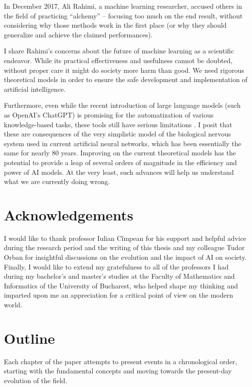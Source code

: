 In December 2017, Ali Rahimi, a machine learning researcher, accused others in the field of practicing ``alchemy'' \cite{Hutson2018_MachineLearningIsAlchemy} -- focusing too much on the end result, without considering why those methods work in the first place (or why they should generalize and achieve the claimed performances).

I share Rahimi's concerns about the future of machine learning as a scientific endeavor. While its practical effectiveness and usefulness cannot be doubted, without proper care it might do society more harm than good. We need rigorous theoretical models in order to ensure the safe development and implementation of artificial intelligence.

Furthermore, even while the recent introduction of large language models (such as OpenAI's ChatGPT) is promising for the automatization of various knowledge-based tasks, these tools still have serious limitations \cite{Bender2021}. I posit that these are consequences of the very simplistic model of the biological nervous system used in current artificial neural networks, which has been essentially the same for nearly 80 years. Improving on the current theoretical models has the potential to provide a leap of several orders of magnitude in the efficiency and power of AI models. At the very least, such advances will help us understand what we are currently doing wrong.

\section{Acknowledgements}

I would like to thank professor Iulian Cîmpean for his support and helpful advice during the research period and the writing of this thesis and my colleague Tudor Orban for insightful discussions on the evolution and the impact of AI on society. Finally, I would like to extend my gratefulness to all of the professors I had during my bachelor's and master's studies at the Faculty of Mathematics and Informatics of the University of Bucharest, who helped shape my thinking and imparted upon me an appreciation for a critical point of view on the modern world.

\section{Outline}

Each chapter of the paper attempts to present events in a chronological order, starting with the fundamental concepts and moving towards the present-day evolution of the field.

